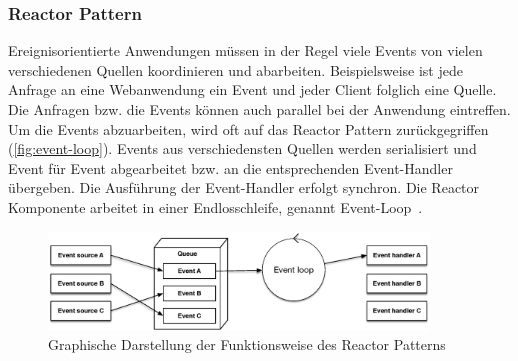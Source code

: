 \subsubsection{Reactor Pattern}
Ereignisorientierte Anwendungen müssen in der Regel viele Events von vielen verschiedenen Quellen koordinieren und abarbeiten. Beispielsweise ist jede Anfrage an eine Webanwendung ein Event und jeder Client folglich eine Quelle. Die Anfragen bzw. die Events können auch parallel bei der Anwendung eintreffen.\\
Um die Events abzuarbeiten, wird oft auf das Reactor Pattern zurückgegriffen (\autoref{fig:event-loop}). Events aus verschiedensten Quellen werden serialisiert und Event für Event abgearbeitet bzw. an die entsprechenden Event-Handler übergeben. Die Ausführung der Event-Handler erfolgt synchron. Die Reactor Komponente arbeitet in einer Endlosschleife, genannt Event-Loop~\cite[S.~260~-~S.~261]{buschmann_pattern_2011}.

\begin{figure}[H]
 \centering
 \includegraphics[width=0.9\textwidth]{4-Hauptteil/event-loop/event-loop.eps}
 \caption{Graphische Darstellung der Funktionsweise des Reactor Patterns}
 \label{fig:event-loop}
\end{figure}

